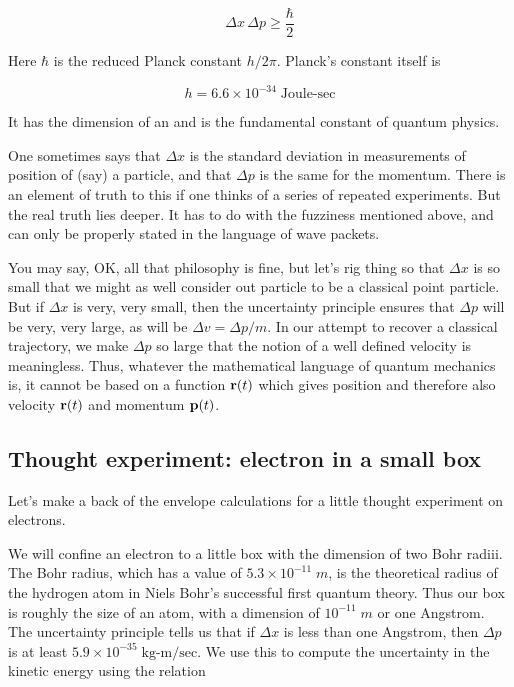 \begin{equation}
  \Delta x \, \Delta p \ge \frac{\hbar}{2}
\end{equation}

Here $\hbar$ is the reduced Planck constant $h/2\pi$.
Planck's constant itself is

\begin{equation}
h = 6.6\times 10^{-34}\;\text{Joule-sec}
\end{equation}

It has the dimension of an  and is the fundamental constant of quantum physics.

One sometimes says that $\Delta x$ is the standard deviation in measurements of position of (say) a particle, and that $\Delta p$ is the same for the momentum.  There is an element of truth to this if one thinks of a series of repeated experiments.  But the real truth lies deeper.  It has to do with the fuzziness mentioned above, and can only be properly stated in the language of wave packets.

You may say, OK, all that philosophy is fine, but let's rig thing so that $\Delta x$ is so small that we might as well consider out particle to be a classical point particle.  But if $\Delta x$ is very, very small, then the uncertainty principle ensures that $\Delta p$ will be very, very large, as will be $\Delta v = \Delta p/m$.  In our attempt to recover a classical trajectory, we make $\Delta p$ so large that the notion of a well defined velocity is meaningless. Thus, whatever the mathematical language of quantum mechanics is, it cannot be based on a function ${\bf r}(t)$ which gives position and therefore also velocity ${\bf r}(t)$ and momentum ${\bf p}(t)$.



\subsection{Thought experiment: electron in a small box}


Let's make a back of the envelope calculations for a little thought experiment on electrons.

We will confine an electron to a little box with the dimension of two Bohr radiii.  The Bohr radius, which has a value of $5.3\times 10^{-11}\; m$, is the theoretical radius of the hydrogen atom in Niels Bohr's successful first quantum theory.  Thus our box is roughly the size of an atom, with a dimension of $10^{-11}\; m$ or one Angstrom.  The uncertainty principle tells us that if $\Delta x$ is less than one Angstrom, then $\Delta p$ is at least $5.9\times 10^{-35}\; \text{kg-m/sec}$. We use this to compute the uncertainty in the kinetic energy using the relation

